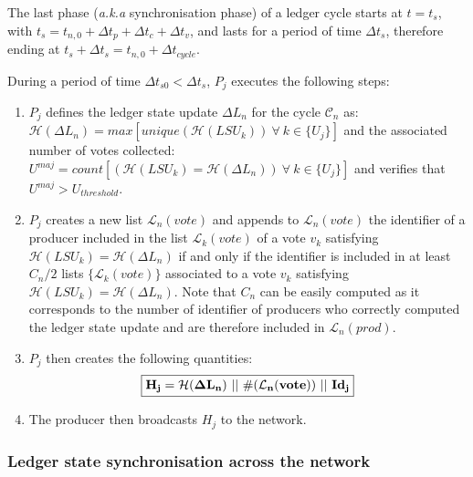 The last phase (\textit{a.k.a} synchronisation phase) of a ledger cycle starts at $t = t_s$, with $t_s = t_{n,0} + \Delta t_{p} + \Delta t_{c}+ \Delta t_{v}$, and lasts for a period of time $\Delta t_{s}$, therefore ending at $t_s+\Delta t_s = t_{n,0} + \Delta t_{cycle}$.

During a period of time $\Delta t_{s0} < \Delta t_{s}$, $P_j$ executes the following steps:

\begin{enumerate}
\item $P_j$ defines the ledger state update $\Delta L_n$ for the cycle $\mathcal{C}_n$ as:\\
 $\mathcal{H}(\Delta L_n) = max[unique(\mathcal{H}(LSU_k))~\forall~k\in\{U_j\}]$ and the associated number of votes collected: $U^{maj} = count[(\mathcal{H}(LSU_k) = \mathcal{H}(\Delta L_n))~\forall~k\in\{U_j\}]$ and verifies that $U^{maj}> U_{threshold}$.
\item $P_j$ creates a new list $\mathcal{L}_{n}(vote)$ and appends to $\mathcal{L}_{n}(vote)$ the identifier of a producer included in the list $\mathcal{L}_{k}(vote)$ of a vote $v_k$ satisfying $\mathcal{H}(LSU_k) = \mathcal{H}(\Delta L_n)$ if and only if the identifier is included in at least $C_n/2$ lists $\{\mathcal{L}_{k}(vote)\}$ associated to a vote $v_{k}$ satisfying $\mathcal{H}(LSU_k) = \mathcal{H}(\Delta L_n)$. Note that $C_n$ can be easily computed as it corresponds to the number of identifier of producers who correctly computed the ledger state update and are therefore included in $\mathcal{L}_{n}(prod)$.
\item $P_j$ then creates the following quantities:
\begin{equation} 
\fbox{$\mathbf{H_{j} = \mathcal{H}(\Delta L_n)~||~\#(\mathcal{L}_{n}(vote))~||~Id_j}$}
\label{eq:Hj}
\end{equation}
\item The producer then broadcasts $H_j$ to the network.%
\end{enumerate}


\subsubsection{Ledger state synchronisation across the network}

